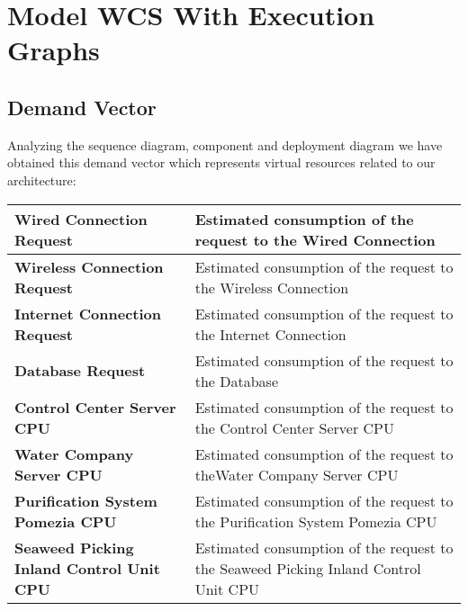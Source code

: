 \chapter{\textbf{Model WCS With Execution Graphs}}

\section{Demand Vector}

Analyzing the sequence diagram, component and deployment diagram we have obtained this demand vector which represents virtual resources related to our architecture:

\begin{longtable}{|p{6cm}|p{9cm}|}

\hline
\textbf{Wired Connection Request} & Estimated consumption of the 											request to the Wired Connection \\

\hline
\textbf{Wireless Connection Request} & Estimated consumption of the 										   request to the Wireless 												   Connection \\

\hline
\textbf{Internet Connection Request} & Estimated consumption of the 										   request to the Internet 												   Connection \\

\hline
\textbf{Database Request} & Estimated consumption of the request to 								the Database \\ 

\hline
\textbf{Control Center Server CPU} & Estimated consumption of the 											 request to the Control Center 											 Server CPU\\

\hline
\textbf{Water Company Server CPU} & Estimated consumption of the 											request to theWater Company Server										CPU\\

\hline
\textbf{Purification System Pomezia CPU} & Estimated consumption of 											   the request to the 													   Purification System Pomezia 										   CPU\\


\hline
\textbf{Seaweed Picking Inland Control Unit CPU} & Estimated 															   consumption of 											   			   the request to the 													   Seaweed Picking 														   Inland Control Unit 												   CPU\\


\end{longtable}

